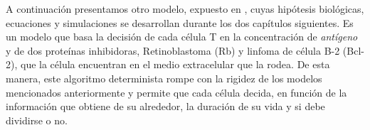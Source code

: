 A continuación presentamos otro modelo, expuesto en \cite{JTB}, cuyas hipótesis biológicas, ecuaciones y simulaciones se desarrollan durante los dos capítulos siguientes. Es un modelo que basa la decisión de cada célula T en la concentración de \textit{antígeno} y de dos proteínas inhibidoras, Retinoblastoma (Rb) y linfoma de célula B-2 (Bcl-2), que la célula encuentran en el medio extracelular que la rodea. De esta manera, este algoritmo determinista rompe con la rigidez de los modelos mencionados anteriormente y permite que cada célula decida, en función de la información que obtiene de su alrededor, la duración de su vida y si debe dividirse o no. 


